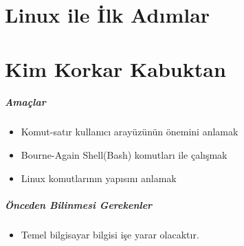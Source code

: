 \documentclass[10pt,a5paper]{book}
\begin{document}
\chapter{Linux ile İlk Adımlar}


\chapter{Kim Korkar Kabuktan}
\paragraph{Amaçlar}
\begin{itemize}
 \item Komut-satır kullanıcı arayüzünün önemini anlamak
 \item Bourne-Again Shell(Bash) komutları ile çalışmak
 \item Linux komutlarının yapısını anlamak
 \end{itemize}
 
\paragraph{Önceden Bilinmesi Gerekenler}
\begin{itemize}
 \item Temel bilgisayar bilgisi işe yarar olacaktır.
 \end{itemize}
\end{document}
